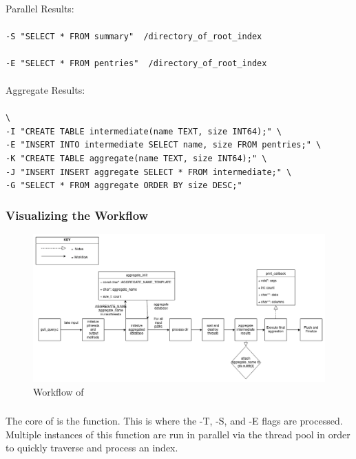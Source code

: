 \noindent Parallel Results:
\\\\
\indent \gufiquery \texttt{-S "SELECT * FROM summary"
  ~/directory\_of\_root\_index}
\\\\
\indent \gufiquery \texttt{-E "SELECT * FROM pentries"
  ~/directory\_of\_root\_index}
\\\\
\noindent Aggregate Results:
\\\\
\indent \gufiquery \texttt{\textbackslash} \\
\indent \texttt{-I "CREATE TABLE intermediate(name TEXT, size INT64);" \textbackslash} \\
\indent \texttt{-E "INSERT INTO intermediate SELECT name, size FROM pentries;" \textbackslash} \\
\indent \texttt{-K "CREATE TABLE aggregate(name TEXT, size INT64);" \textbackslash} \\
\indent \texttt{-J "INSERT INSERT aggregate SELECT * FROM intermediate;" \textbackslash} \\
\indent \texttt{-G "SELECT * FROM aggregate ORDER BY size DESC;"} \\

\subsubsection{Visualizing the Workflow}
\begin{figure} [H]
  \centering
  \includegraphics[width=\textwidth]{images/gufi_query_main.png}
  \caption{Workflow of \gufiquery}
\end{figure}

\subsubsection{\processdir}
The core of \gufiquery is the \processdir function. This is where the
-T, -S, and -E flags are processed. Multiple instances of this
function are run in parallel via the thread pool in order to quickly
traverse and process an index.

